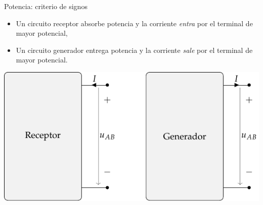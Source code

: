 \documentclass[aspectratio=169, usenames,svgnames,dvipsnames]{beamer}
\begin{document}
\begin{frame}[label={sec:orgdb2eac7}]{Potencia: criterio de signos}
\begin{itemize}
\item Un \alert{circuito receptor absorbe potencia} y la corriente \emph{entra} por el terminal de mayor potencial,
\item Un \alert{circuito generador entrega potencia} y la corriente \emph{sale} por el terminal de mayor potencial.
\end{itemize}

\begin{center}
\includegraphics[height=0.5\textheight]{../figs/receptor_generador.pdf}
\end{center}
\end{frame}
\end{document}
